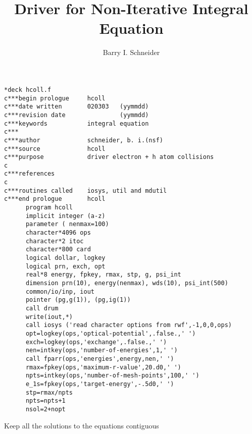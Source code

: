 \documentclass{article}
\title{Driver for Non-Iterative Integral Equation}
\author{Barry I. Schneider}
\date{}
\begin{document}
 \maketitle
\begin{verbatim}
*deck hcoll.f 
c***begin prologue     hcoll
c***date written       020303   (yymmdd)
c***revision date               (yymmdd)
c***keywords           integral equation
c***                   
c***author             schneider, b. i.(nsf)
c***source             hcoll
c***purpose            driver electron + h atom collisions
c
c***references       
c
c***routines called    iosys, util and mdutil
c***end prologue       hcoll
      program hcoll
      implicit integer (a-z)
      parameter ( nenmax=100)
      character*4096 ops
      character*2 itoc
      character*800 card
      logical dollar, logkey
      logical prn, exch, opt 
      real*8 energy, fpkey, rmax, stp, g, psi_int
      dimension prn(10), energy(nenmax), wds(10), psi_int(500)
      common/io/inp, iout      
      pointer (pg,g(1)), (pg,ig(1))
      call drum
      write(iout,*)
      call iosys ('read character options from rwf',-1,0,0,ops)
      opt=logkey(ops,'optical-potential',.false.,' ')
      exch=logkey(ops,'exchange',.false.,' ')
      nen=intkey(ops,'number-of-energies',1,' ')
      call fparr(ops,'energies',energy,nen,' ')
      rmax=fpkey(ops,'maximum-r-value',20.d0,' ')
      npts=intkey(ops,'number-of-mesh-points',100,' ')
      e_1s=fpkey(ops,'target-energy',-.5d0,' ')
      stp=rmax/npts
      npts=npts+1
      nsol=2+nopt
\end{verbatim}
     Keep all the solutions to the equations contiguous
\end{document}
